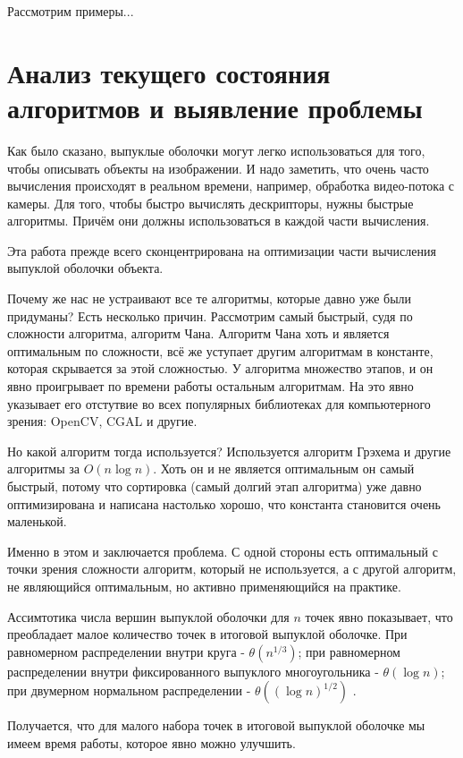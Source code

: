 Рассмотрим примеры... %

\section{Анализ текущего состояния алгоритмов и выявление проблемы} \label{sect1_2}

Как было сказано, выпуклые оболочки могут легко использоваться для того, чтобы описывать объекты на изображении. И надо заметить, что очень часто вычисления происходят в реальном времени, например, обработка видео-потока с камеры. Для того, чтобы быстро вычислять дескрипторы, нужны быстрые алгоритмы. Причём они должны использоваться в каждой части вычисления.

Эта работа прежде всего сконцентрирована на оптимизации части вычисления выпуклой оболочки объекта.

Почему же нас не устраивают все те алгоритмы, которые давно уже были придуманы? Есть несколько причин. Рассмотрим самый быстрый, судя по сложности алгоритма, алгоритм Чана. Алгоритм Чана хоть и является оптимальным по сложности, всё же уступает другим алгоритмам в константе, которая скрывается за этой сложностью. У алгоритма множество этапов, и он явно проигрывает по времени работы остальным алгоритмам. На это явно указывает его отстутвие во всех популярных библиотеках для компьютерного зрения: OpenCV\cite{opencvconvexhull}, CGAL\cite{cgalconvexhull} и другие.

Но какой алгоритм тогда используется? Используется алгоритм Грэхема и другие алгоритмы за $O(n \log n)$. Хоть он и не является оптимальным он самый быстрый, потому что сортировка (самый долгий этап алгоритма) уже давно оптимизирована и написана настолько хорошо, что константа становится очень маленькой.

Именно в этом и заключается проблема. С одной стороны есть оптимальный с точки зрения сложности алгоритм, который не используется, а с другой алгоритм, не являющийся оптимальным, но активно применяющийся на практике.

Ассимтотика числа вершин выпуклой оболочки для $n$ точек явно показывает, что преобладает малое количество точек в итоговой выпуклой оболочке. При равномерном распределении внутри круга - $\theta(n^{1/3})$; при равномерном распределении внутри фиксированного выпуклого многоугольника - $\theta(\log n)$; при двумерном нормальном распределении - $\theta((\log n)^{1/2})$ \cite{algolist2010convexhull}.

Получается, что для малого набора точек в итоговой выпуклой оболочке мы имеем время работы, которое явно можно улучшить.

